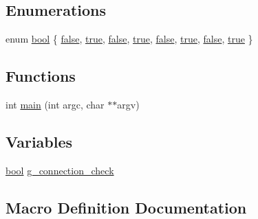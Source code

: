 \subsection*{Enumerations}
\begin{DoxyCompactItemize}
\item 
enum \mbox{\hyperlink{piconet_2l2cap-client_8c_af6a258d8f3ee5206d682d799316314b1}{bool}} \{ \newline
\mbox{\hyperlink{piconet_2l2cap-client_8c_af6a258d8f3ee5206d682d799316314b1ae9de385ef6fe9bf3360d1038396b884c}{false}}, 
\mbox{\hyperlink{piconet_2l2cap-client_8c_af6a258d8f3ee5206d682d799316314b1a08f175a5505a10b9ed657defeb050e4b}{true}}, 
\mbox{\hyperlink{piconet_2l2cap-server_8c_af6a258d8f3ee5206d682d799316314b1ae9de385ef6fe9bf3360d1038396b884c}{false}}, 
\mbox{\hyperlink{piconet_2l2cap-server_8c_af6a258d8f3ee5206d682d799316314b1a08f175a5505a10b9ed657defeb050e4b}{true}}, 
\newline
\mbox{\hyperlink{connection__handler_8c_af6a258d8f3ee5206d682d799316314b1ae9de385ef6fe9bf3360d1038396b884c}{false}}, 
\mbox{\hyperlink{connection__handler_8c_af6a258d8f3ee5206d682d799316314b1a08f175a5505a10b9ed657defeb050e4b}{true}}, 
\mbox{\hyperlink{tcpserver_2l2cap-client_8c_af6a258d8f3ee5206d682d799316314b1ae9de385ef6fe9bf3360d1038396b884c}{false}}, 
\mbox{\hyperlink{tcpserver_2l2cap-client_8c_af6a258d8f3ee5206d682d799316314b1a08f175a5505a10b9ed657defeb050e4b}{true}}
 \}
\end{DoxyCompactItemize}
\subsection*{Functions}
\begin{DoxyCompactItemize}
\item 
int \mbox{\hyperlink{piconet_2l2cap-client_8c_a3c04138a5bfe5d72780bb7e82a18e627}{main}} (int argc, char $\ast$$\ast$argv)
\end{DoxyCompactItemize}
\subsection*{Variables}
\begin{DoxyCompactItemize}
\item 
\mbox{\hyperlink{piconet_2l2cap-client_8c_af6a258d8f3ee5206d682d799316314b1}{bool}} \mbox{\hyperlink{piconet_2l2cap-client_8c_a81bc6941c354c1be6ad9931b4f2b50bf}{g\+\_\+connection\+\_\+check}}
\end{DoxyCompactItemize}


\subsection{Macro Definition Documentation}
\mbox{\label{piconet_2l2cap-client_8c_acd26973fe5a2cba0e34e0d81717c6bda}} 
